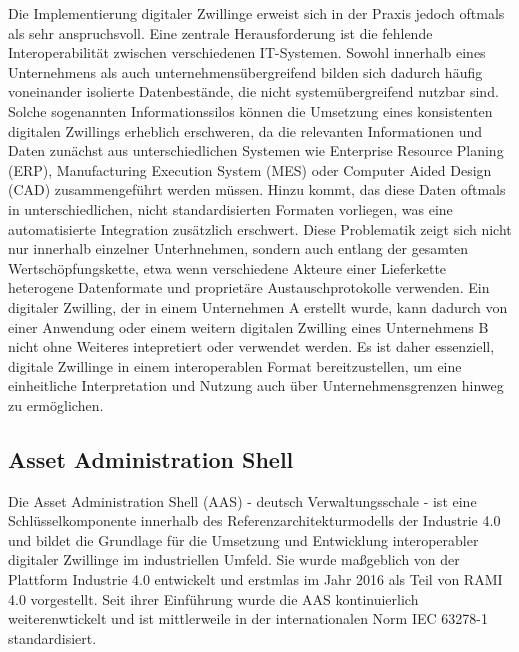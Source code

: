 Die Implementierung digitaler Zwillinge erweist sich in der Praxis jedoch oftmals als sehr anspruchsvoll.
Eine zentrale Herausforderung ist die fehlende Interoperabilität zwischen verschiedenen IT-Systemen.
Sowohl innerhalb eines Unternehmens als auch unternehmensübergreifend bilden sich dadurch häufig voneinander isolierte Datenbestände, die nicht systemübergreifend nutzbar sind.
Solche sogenannten Informationssilos können die Umsetzung eines konsistenten digitalen Zwillings erheblich erschweren, da die relevanten Informationen und Daten zunächst aus unterschiedlichen Systemen wie Enterprise Resource Planing (ERP), Manufacturing Execution System (MES) oder Computer Aided Design (CAD) zusammengeführt werden müssen.
Hinzu kommt, das diese Daten oftmals in unterschiedlichen, nicht standardisierten Formaten vorliegen, was eine automatisierte Integration zusätzlich erschwert.
Diese Problematik zeigt sich nicht nur innerhalb einzelner Unterhnehmen, sondern auch entlang der gesamten Wertschöpfungskette, etwa wenn verschiedene Akteure einer Lieferkette heterogene Datenformate und proprietäre Austauschprotokolle verwenden.
Ein digitaler Zwilling, der in einem Unternehmen A erstellt wurde, kann dadurch von einer Anwendung oder einem weitern digitalen Zwilling eines Unternehmens B nicht ohne Weiteres intepretiert oder verwendet werden.
Es ist daher essenziell, digitale Zwillinge in einem interoperablen Format bereitzustellen, um eine einheitliche Interpretation und Nutzung auch über Unternehmensgrenzen hinweg zu ermöglichen.
\cite{DTandAASConceptsInI4.0}





\newpage
\subsection{Asset Administration Shell}
\label{chap:AAS}
Die Asset Administration Shell (AAS) - deutsch Verwaltungsschale - ist eine Schlüsselkomponente innerhalb des Referenzarchitekturmodells der Industrie 4.0 \cite{RAMI4.0} und bildet die Grundlage für die Umsetzung und Entwicklung interoperabler digitaler Zwillinge im industriellen Umfeld.
Sie wurde maßgeblich von der Plattform Industrie 4.0 entwickelt und erstmlas im Jahr 2016 als Teil von RAMI 4.0 vorgestellt.
Seit ihrer Einführung wurde die AAS kontinuierlich weiterenwtickelt und ist mittlerweile in der internationalen Norm IEC 63278-1 \cite{AASIEC63278} standardisiert.

